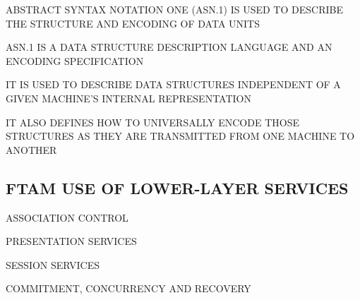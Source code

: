 \begin{bwslide}

\begin{nrtc}
\item	ABSTRACT SYNTAX NOTATION ONE (ASN.1) IS USED TO DESCRIBE THE STRUCTURE
	AND ENCODING OF DATA UNITS

\item	ASN.1 IS A DATA STRUCTURE DESCRIPTION LANGUAGE AND AN ENCODING
	SPECIFICATION
    \begin{nrtc}
    \item	IT IS USED TO DESCRIBE DATA STRUCTURES INDEPENDENT OF A
		GIVEN MACHINE'S INTERNAL REPRESENTATION

    \item	IT ALSO DEFINES HOW TO UNIVERSALLY ENCODE THOSE STRUCTURES
		AS THEY ARE TRANSMITTED FROM ONE MACHINE TO ANOTHER
    \end{nrtc}
\end{nrtc}
\end{bwslide}


\begin{bwslide}
\part*	{FTAM USE OF LOWER-LAYER SERVICES}\bf

\begin{nrtc}
\item	ASSOCIATION CONTROL

\item	PRESENTATION SERVICES

\item	SESSION SERVICES

\item	COMMITMENT, CONCURRENCY AND RECOVERY
\end{nrtc}
\end{bwslide}





